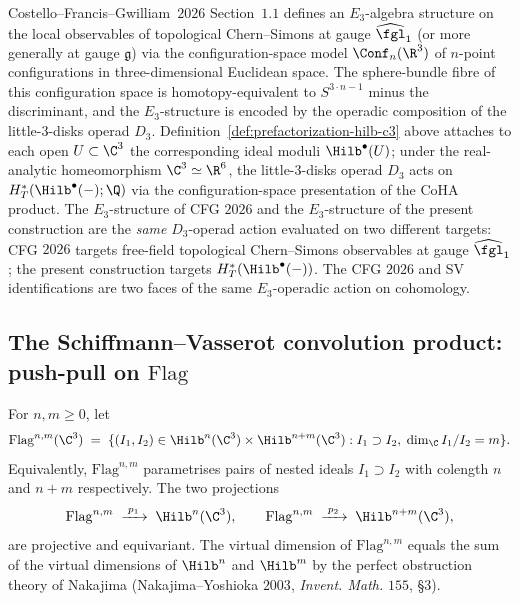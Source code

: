 \begin{remark}
\label{rem:cfg-2026-side-by-side}
Costello--Francis--Gwilliam~$2026$ Section~$1.1$ defines an $E_3$-algebra
structure on the local observables of topological Chern--Simons at gauge
$\widehat{\fgl}_1$ (or more generally at gauge $\mathfrak g$) via the
configuration-space model $\Conf_n(\R^3)$ of $n$-point configurations
in three-dimensional Euclidean space. The sphere-bundle fibre of this
configuration space is homotopy-equivalent to $S^{3 \cdot n - 1}$
minus the discriminant, and the $E_3$-structure is encoded by the
operadic composition of the little-$3$-disks operad $D_3$.
Definition~\ref{def:prefactorization-hilb-c3} above attaches to each
open $U \subset \C^3$ the corresponding ideal moduli
$\Hilb^\bullet(U)$; under the real-analytic homeomorphism
$\C^3 \simeq \R^6$, the little-$3$-disks operad $D_3$ acts on
$H^*_T(\Hilb^\bullet(-); \Q)$ via the configuration-space presentation
of the CoHA product. The $E_3$-structure of CFG $2026$ and the
$E_3$-structure of the present construction are the \emph{same}
$D_3$-operad action evaluated on two different targets: CFG $2026$
targets free-field topological Chern--Simons observables at gauge
$\widehat{\fgl}_1$; the present construction targets
$H^*_T(\Hilb^\bullet(-))$. The CFG $2026$ and SV identifications are
two faces of the same $E_3$-operadic action on cohomology.
\end{remark}

\subsection*{The Schiffmann--Vasserot convolution product: push-pull on $\mathrm{Flag}$}

\begin{definition}
\label{def:nakajima-flag-correspondence}
\ClaimStatusDefinitional
For $n, m \geq 0$, let
\[
 \mathrm{Flag}^{n, m}(\C^3)
 \;=\; \{(I_1, I_2) \in \Hilb^n(\C^3) \times \Hilb^{n + m}(\C^3)
 : I_1 \supset I_2,\; \dim_\C I_1 / I_2 = m\}.
\]
Equivalently, $\mathrm{Flag}^{n, m}$ parametrises pairs of nested ideals
$I_1 \supset I_2$ with colength $n$ and $n + m$ respectively. The two
projections
\[
 \mathrm{Flag}^{n, m} \;\xrightarrow{\;p_1\;}\; \Hilb^n(\C^3),
 \qquad
 \mathrm{Flag}^{n, m} \;\xrightarrow{\;p_2\;}\; \Hilb^{n + m}(\C^3),
\]
are projective and equivariant. The virtual dimension of
$\mathrm{Flag}^{n, m}$ equals the sum of the virtual dimensions of
$\Hilb^n$ and $\Hilb^m$ by the perfect obstruction theory of Nakajima
(Nakajima--Yoshioka $2003$, \textit{Invent. Math.} $155$, \S$3$).
\end{definition}

